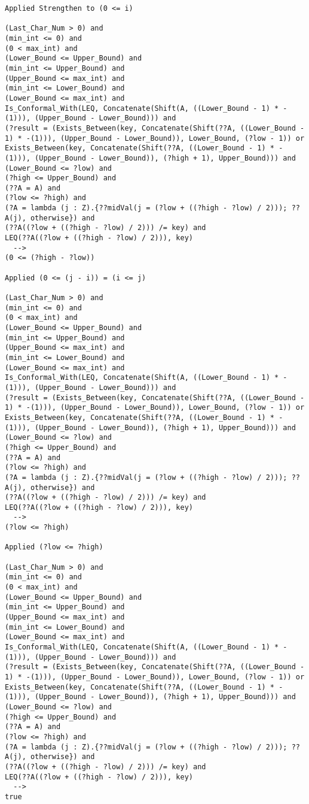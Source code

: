 \begin{lstlisting}[language=resolve]
Applied Strengthen to (0 <= i)

(Last_Char_Num > 0) and
(min_int <= 0) and
(0 < max_int) and
(Lower_Bound <= Upper_Bound) and
(min_int <= Upper_Bound) and
(Upper_Bound <= max_int) and
(min_int <= Lower_Bound) and
(Lower_Bound <= max_int) and
Is_Conformal_With(LEQ, Concatenate(Shift(A, ((Lower_Bound - 1) * -(1))), (Upper_Bound - Lower_Bound))) and
(?result = (Exists_Between(key, Concatenate(Shift(??A, ((Lower_Bound - 1) * -(1))), (Upper_Bound - Lower_Bound)), Lower_Bound, (?low - 1)) or Exists_Between(key, Concatenate(Shift(??A, ((Lower_Bound - 1) * -(1))), (Upper_Bound - Lower_Bound)), (?high + 1), Upper_Bound))) and
(Lower_Bound <= ?low) and
(?high <= Upper_Bound) and
(??A = A) and
(?low <= ?high) and
(?A = lambda (j : Z).{??midVal(j = (?low + ((?high - ?low) / 2))); ??A(j), otherwise}) and
(??A((?low + ((?high - ?low) / 2))) /= key) and
LEQ(??A((?low + ((?high - ?low) / 2))), key)
  -->
(0 <= (?high - ?low))

Applied (0 <= (j - i)) = (i <= j)

(Last_Char_Num > 0) and
(min_int <= 0) and
(0 < max_int) and
(Lower_Bound <= Upper_Bound) and
(min_int <= Upper_Bound) and
(Upper_Bound <= max_int) and
(min_int <= Lower_Bound) and
(Lower_Bound <= max_int) and
Is_Conformal_With(LEQ, Concatenate(Shift(A, ((Lower_Bound - 1) * -(1))), (Upper_Bound - Lower_Bound))) and
(?result = (Exists_Between(key, Concatenate(Shift(??A, ((Lower_Bound - 1) * -(1))), (Upper_Bound - Lower_Bound)), Lower_Bound, (?low - 1)) or Exists_Between(key, Concatenate(Shift(??A, ((Lower_Bound - 1) * -(1))), (Upper_Bound - Lower_Bound)), (?high + 1), Upper_Bound))) and
(Lower_Bound <= ?low) and
(?high <= Upper_Bound) and
(??A = A) and
(?low <= ?high) and
(?A = lambda (j : Z).{??midVal(j = (?low + ((?high - ?low) / 2))); ??A(j), otherwise}) and
(??A((?low + ((?high - ?low) / 2))) /= key) and
LEQ(??A((?low + ((?high - ?low) / 2))), key)
  -->
(?low <= ?high)

Applied (?low <= ?high)

(Last_Char_Num > 0) and
(min_int <= 0) and
(0 < max_int) and
(Lower_Bound <= Upper_Bound) and
(min_int <= Upper_Bound) and
(Upper_Bound <= max_int) and
(min_int <= Lower_Bound) and
(Lower_Bound <= max_int) and
Is_Conformal_With(LEQ, Concatenate(Shift(A, ((Lower_Bound - 1) * -(1))), (Upper_Bound - Lower_Bound))) and
(?result = (Exists_Between(key, Concatenate(Shift(??A, ((Lower_Bound - 1) * -(1))), (Upper_Bound - Lower_Bound)), Lower_Bound, (?low - 1)) or Exists_Between(key, Concatenate(Shift(??A, ((Lower_Bound - 1) * -(1))), (Upper_Bound - Lower_Bound)), (?high + 1), Upper_Bound))) and
(Lower_Bound <= ?low) and
(?high <= Upper_Bound) and
(??A = A) and
(?low <= ?high) and
(?A = lambda (j : Z).{??midVal(j = (?low + ((?high - ?low) / 2))); ??A(j), otherwise}) and
(??A((?low + ((?high - ?low) / 2))) /= key) and
LEQ(??A((?low + ((?high - ?low) / 2))), key)
  -->
true


\end{lstlisting}

